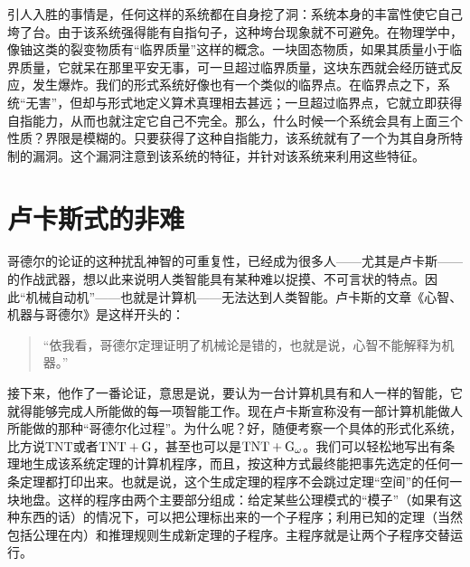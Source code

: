引人入胜的事情是，任何这样的系统都在自身挖了洞：系统本身的丰富性使它自己垮了台。由于该系统强得能有自指句子，这种垮台现象就不可避免。在物理学中，像铀这类的裂变物质有“临界质量”这样的概念。一块固态物质，如果其质量小于临界质量，它就呆在那里平安无事，可一旦超过临界质量，这块东西就会经历链式反应，发生爆炸。我们的形式系统好像也有一个类似的临界点。在临界点之下，系统“无害”，但却与形式地定义算术真理相去甚远；一旦超过临界点，它就立即获得自指能力，从而也就注定它自己不完全。那么，什么时候一个系统会具有上面三个性质？界限是模糊的。只要获得了这种自指能力，该系统就有了一个为其自身所特制的漏洞。这个漏洞注意到该系统的特征，并针对该系统来利用这些特征。

\section{卢卡斯式的非难}

哥德尔的论证的这种扰乱神智的可重复性，已经成为很多人——尤其是卢卡斯——的作战武器，想以此来说明人类智能具有某种难以捉摸、不可言状的特点。因此“机械自动机”——也就是计算机——无法达到人类智能。卢卡斯的文章《心智、机器与哥德尔》是这样开头的：

\begin{quote}
“依我看，哥德尔定理证明了机械论是错的，也就是说，心智不能解释为机器。”
\end{quote}
接下来，他作了一番论证，意思是说，要认为一台计算机具有和人一样的智能，它就得能够完成人所能做的每一项智能工作。现在卢卡斯宣称没有一部计算机能做人所能做的那种“哥德尔化过程”。为什么呢？好，随便考察一个具体的形式化系统，比方说TNT或者$\mathrm { TNT }+\mathrm { G }$，甚至也可以是$\mathrm { TNT }+\mathrm { G }_\omega$。我们可以轻松地写出有条理地生成该系统定理的计算机程序，而且，按这种方式最终能把事先选定的任何一条定理都打印出来。也就是说，这个生成定理的程序不会跳过定理“空间”的任何一块地盘。这样的程序由两个主要部分组成：给定某些公理模式的“模子”（如果有这种东西的话）的情况下，可以把公理标出来的一个子程序；利用已知的定理（当然包括公理在内）和推理规则生成新定理的子程序。主程序就是让两个子程序交替运行。

